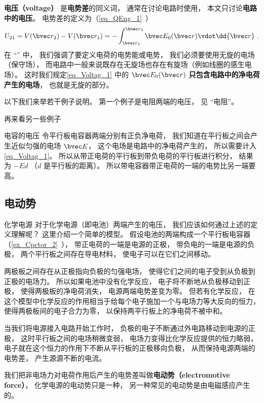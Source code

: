 

\textbf{电压（voltage）} 是\textbf{电势差}的同义词， 通常在讨论电路时使用， 本文只讨论\textbf{电路中的电压}。 电势差的定义为（\autoref{eq_QEng_1}~）
\begin{equation}\label{eq_Voltag_1}
U_{21} = V(\bvec r_2) - V(\bvec r_1) = - \int_{\bvec r_1}^{\bvec r_2} \bvec E_0(\bvec r) \vdot \dd{\bvec r}~.
\end{equation}
在 “” 中， 我们强调了要定义电荷的电势能或电势， 我们必须要使用无旋的电场（保守场）， 而电路中一般来说既存在无旋场也存在有旋场（例如线圈的感生电场）。 这时我们规定\autoref{eq_Voltag_1} 中的 $\bvec E_0(\bvec r)$ \textbf{只包含电路中的净电荷产生的电场}， 也就是无旋的部分。

以下我们来举若干例子说明。 第一个例子是电阻两端的电压， 见 “电阻”。

再来看另一些例子
\begin{example}{电容的电压}
令平行板电容器两端分别有正负净电荷， 我们知道在平行板之间会产生近似匀强的电场 $\bvec E$， 这个电场是电路中的净电荷产生的， 所以需要计入\autoref{eq_Voltag_1}。 所以从带正电荷的平行板到带负电荷的平行板进行积分， 结果为 $-E d$ （$d$ 是平行板的距离）。 所以带电容器带正电荷的一端的电势比另一端要高。
\end{example}

\subsection{电动势}
\begin{example}{化学电源}
对于化学电源（即电池）两端产生的电压， 我们应该如何通过上述的定义理解呢？ 这里介绍一个简单的模型。 假设电池的两端构成一个平行板电容器（\autoref{ex_Cpctor_2}~）， 带正电荷的一端是电源的正极， 带负电的一端是电源的负极， 两个平行板之间存在导电材料， 使电子可以在它们之间移动。

两极板之间存在从正极指向负极的匀强电场， 使得它们之间的电子受到从负极到正极的电场力。 所以如果电池中没有化学反应， 电子将不断地从负极移动到正极， 使得两极板的净电荷消失， 电源两端电势差变为零。 但若有化学反应， 在这个模型中化学反应的作用相当于给每个电子施加一个与电场力等大反向的恒力， 使得两极板间的电子合力为零， 以保持两平行板上的净电荷不被中和。

当我们将电源接入电路开始工作时， 负极的电子不断通过外电路移动到电源的正极， 这时平行板之间的电场稍微变弱， 电场力变得比化学反应提供的恒力略弱， 电子就在这个恒力的作用下不断从平行板的正极移向负极， 从而保持电源两端的电势差， 产生源源不断的电流。
\end{example}
我们把非电场力对电荷作用后产生的电势差叫做\textbf{电动势（electromotive force）}， 化学电源的电动势只是一种， 另一种常见的电动势是由电磁感应产生的。

